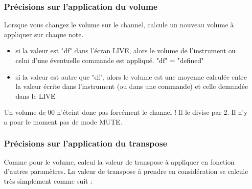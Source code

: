 \subsubsection{Précisions sur l'application du volume}

Lorsque vous changez le volume sur le channel, \FAT calcule un nouveau volume à appliquer sur chaque note.
\medskip

\begin{itemize}
    \item{si la valeur est "df" dans l'écran LIVE, alors le volume de l'instrument ou celui d'une éventuelle commande est appliqué. "df" = "defined"}
    \item{si la valeur est autre que "df", alors le volume est une moyenne calculée entre la valeur écrite dans l'instrument (ou dans une commande) et celle demandée dans le LIVE}
\end{itemize}
\medskip

Un volume de 00 n'éteint donc pas forcément le channel ! Il le divise par 2.
Il n'y a pour le moment pas de mode MUTE.


\subsubsection{Précisions sur l'application du transpose}

Comme pour le volume, \FAT calcul la valeur de transpose à appliquer en fonction d'autres paramètres.
La valeur de transpose à prendre en considération se calcule très simplement comme suit :

